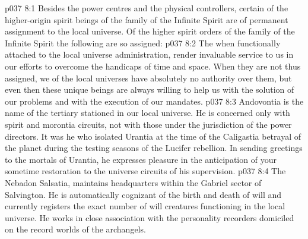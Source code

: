 \vs p037 8:1 Besides the power centres and the physical controllers, certain of the higher\hyp{}origin spirit beings of the family of the Infinite Spirit are of permanent assignment to the local universe. Of the higher spirit orders of the family of the Infinite Spirit the following are so assigned:
\vs p037 8:2 \pc The  when functionally attached to the local universe administration, render invaluable service to us in our efforts to overcome the handicaps of time and space. When they are not thus assigned, we of the local universes have absolutely no authority over them, but even then these unique beings are always willing to help us with the solution of our problems and with the execution of our mandates.
\vs p037 8:3 Andovontia is the name of the tertiary  stationed in our local universe. He is concerned only with spirit and morontia circuits, not with those under the jurisdiction of the power directors. It was he who isolated Urantia at the time of the Caligastia betrayal of the planet during the testing seasons of the Lucifer rebellion. In sending greetings to the mortals of Urantia, he expresses pleasure in the anticipation of your sometime restoration to the universe circuits of his supervision.
\vs p037 8:4 The Nebadon  Salsatia, maintains headquarters within the Gabriel sector of Salvington. He is automatically cognizant of the birth and death of will and currently registers the exact number of will creatures functioning in the local universe. He works in close association with the personality recorders domiciled on the record worlds of the archangels.
